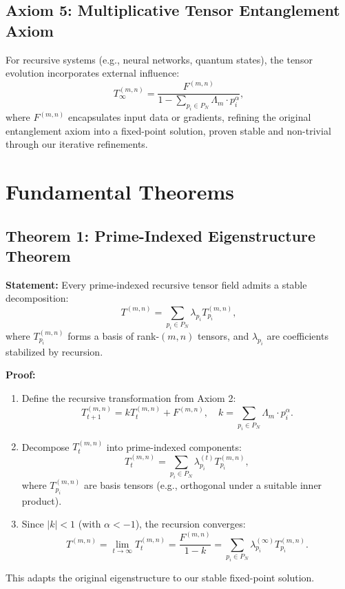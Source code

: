 \documentclass{article}
\theoremstyle{plain}
\begin{document}
\subsection{Axiom 5: Multiplicative Tensor Entanglement Axiom}
For recursive systems (e.g., neural networks, quantum states), the tensor evolution incorporates external influence:
\begin{equation}
    T_\infty^{(m,n)} = \frac{F^{(m,n)}}{1 - \sum_{p_i \in P_N} \Lambda_m \cdot p_i^\alpha},
\end{equation}
where \( F^{(m,n)} \) encapsulates input data or gradients, refining the original entanglement axiom into a fixed-point solution, proven stable and non-trivial through our iterative refinements.

\section{Fundamental Theorems}

\subsection{Theorem 1: Prime-Indexed Eigenstructure Theorem}
\textbf{Statement:} Every prime-indexed recursive tensor field admits a stable decomposition:
\begin{equation}
    T^{(m,n)} = \sum_{p_i \in P_N} \lambda_{p_i} T_{p_i}^{(m,n)},
\end{equation}
where \( T_{p_i}^{(m,n)} \) forms a basis of rank-$(m,n)$ tensors, and \( \lambda_{p_i} \) are coefficients stabilized by recursion.

\textbf{Proof:}
\begin{enumerate}
    \item Define the recursive transformation from Axiom 2:
    \[
    T_{t+1}^{(m,n)} = k T_t^{(m,n)} + F^{(m,n)}, \quad k = \sum_{p_i \in P_N} \Lambda_m \cdot p_i^\alpha.
    \]
    \item Decompose \( T_t^{(m,n)} \) into prime-indexed components:
    \[
    T_t^{(m,n)} = \sum_{p_i \in P_N} \lambda_{p_i}^{(t)} T_{p_i}^{(m,n)},
    \]
    where \( T_{p_i}^{(m,n)} \) are basis tensors (e.g., orthogonal under a suitable inner product).
    \item Since \( |k| < 1 \) (with \( \alpha < -1 \)), the recursion converges:
    \[
    T^{(m,n)} = \lim_{t \to \infty} T_t^{(m,n)} = \frac{F^{(m,n)}}{1 - k} = \sum_{p_i \in P_N} \lambda_{p_i}^{(\infty)} T_{p_i}^{(m,n)}.
    \]
\end{enumerate}
This adapts the original eigenstructure to our stable fixed-point solution.
\end{document}
